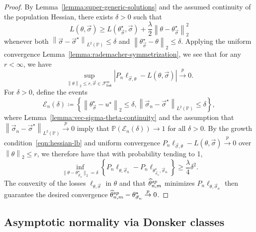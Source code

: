 \documentclass[11pt]{article}
\newcommand{\Prb}{\mathbb{P}}
\renewcommand{\P}{\mathbb{P}}
\newcommand{\mc}[1]{\mathcal{#1}}
\newcommand{\norm}[1]{\left\|{#1}\right\|} %
\newcommand{\what}[1]{\widehat{#1}}
\newcommand{\sem}{^{\textup{sp}}}
\newcommand{\Flink}{\mathcal{F}_{\mathsf{link}}}
\newcommand{\loss}{\ell}
\newcommand{\ltwo}[1]{\norm{#1}_2} %
\newcommand{\norms}[1]{\|{#1}\|} %
\newcommand{\ltwos}[1]{\norms{#1}_2} %
\newcommand{\<}{\langle} %
\renewcommand{\>}{\rangle}
\newcommand{\cp}{\stackrel{p}{\rightarrow}}
\newcommand{\defeq}{\coloneqq}
\newcommand{\LtwoP}[1]{\norm{#1}_{L^2(\Prb)}}
\newcommand{\event}{\mc{E}}
\newcommand{\opt}{^\star}
\newcommand{\spe}{\what{\theta}\sem_{n,m}} %
\newcommand{\G}{\mathbb{G}}
\begin{document}
\begin{proof}
	By Lemma~\ref{lemma:super-generic-solutions}
	and the assumed continuity of the population Hessian,
	there exists $\delta > 0$ such that
	\begin{equation}
		L(\theta, \vec{\sigma}) \ge L(\theta\opt_{\vec{\sigma}}, \vec{\sigma})
		+ \frac{\lambda}{2} \ltwo{\theta - \theta\opt_{\vec{\sigma}}}^2
		\label{eqn:hessian-lb}
	\end{equation}
	whenever both $\LtwoP{\vec{\sigma} - \vec{\sigma}\opt} \le \delta$ and
	$\ltwo{\theta\opt_{\vec{\sigma}} - \theta} \le \delta$. Applying
	the uniform convergence
	Lemma~\ref{lemma:rademacher-symmetrization}, we see that
	for any $r < \infty$, we have
	\begin{equation*}
		\sup_{\ltwo{\theta} \le r, \vec{\sigma} \in \Flink^m}
		|P_n \loss_{\vec{\sigma},\theta} - L(\theta, \vec{\sigma})| \cp 0.
	\end{equation*}
	For $\delta > 0$, define the events
	\begin{equation*}
		\event_n(\delta) \defeq \left \{
		\ltwo{\theta\opt_{\vec{\sigma}} - u\opt} \le \delta,
		\LtwoP{\vec{\sigma}_n - \vec{\sigma}\opt} \le \delta \right\},
	\end{equation*}
	where
	Lemma~\ref{lemma:vec-sigma-theta-continuity}
	and the assumption that $\LtwoP{\vec{\sigma}_n - \vec{\sigma}\opt}
	\cp 0$ imply that $\P(\event_n(\delta)) \to 1$ for all $\delta > 0$.
	By the growth condition~\eqref{eqn:hessian-lb}
	and uniform convergence
	$P_n \loss_{\vec{\sigma},\theta} - L(\theta,\vec{\sigma}) \cp 0$
	over $\ltwo{\theta} \le r$,
	we therefore have that with probability tending to 1, 
	\begin{equation*}
		\inf_{\ltwos{\theta - \theta\opt_{\vec{\sigma}_n}} = \delta}
		\left\{P_n \loss_{\theta,\vec{\sigma}_n} - P_n \loss_{\theta\opt_{\vec{\sigma}_n},
			\vec{\sigma}_n} \right\}
		\ge \frac{\lambda}{4} \delta^2.
	\end{equation*}
	The convexity of the losses $\loss_{\theta,\vec{\sigma}}$ in $\theta$ and that
	$\spe$ minimizes $P_n \loss_{\theta,\vec{\sigma}_n}$ then
	guarantee the desired convergence $\spe - \theta\opt_{\vec{\sigma}_n} \cp 0$.
\end{proof}

\subsection{Asymptotic normality via Donsker classes}

\providecommand{\G}{\mathbb{G}}
\end{document}
